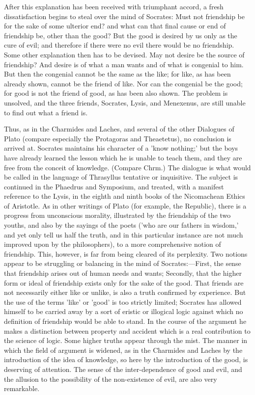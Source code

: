 \documentclass[11pt,letter]{article}
\begin{document}
\par  After this explanation has been received with triumphant accord, a fresh dissatisfaction begins to steal over the mind of Socrates: Must not friendship be for the sake of some ulterior end? and what can that final cause or end of friendship be, other than the good? But the good is desired by us only as the cure of evil; and therefore if there were no evil there would be no friendship. Some other explanation then has to be devised. May not desire be the source of friendship? And desire is of what a man wants and of what is congenial to him. But then the congenial cannot be the same as the like; for like, as has been already shown, cannot be the friend of like. Nor can the congenial be the good; for good is not the friend of good, as has been also shown. The problem is unsolved, and the three friends, Socrates, Lysis, and Menexenus, are still unable to find out what a friend is.

\par  Thus, as in the Charmides and Laches, and several of the other Dialogues of Plato (compare especially the Protagoras and Theaetetus), no conclusion is arrived at. Socrates maintains his character of a 'know nothing;' but the boys have already learned the lesson which he is unable to teach them, and they are free from the conceit of knowledge. (Compare Chrm.) The dialogue is what would be called in the language of Thrasyllus tentative or inquisitive. The subject is continued in the Phaedrus and Symposium, and treated, with a manifest reference to the Lysis, in the eighth and ninth books of the Nicomachean Ethics of Aristotle. As in other writings of Plato (for example, the Republic), there is a progress from unconscious morality, illustrated by the friendship of the two youths, and also by the sayings of the poets ('who are our fathers in wisdom,' and yet only tell us half the truth, and in this particular instance are not much improved upon by the philosophers), to a more comprehensive notion of friendship. This, however, is far from being cleared of its perplexity. Two notions appear to be struggling or balancing in the mind of Socrates:—First, the sense that friendship arises out of human needs and wants; Secondly, that the higher form or ideal of friendship exists only for the sake of the good. That friends are not necessarily either like or unlike, is also a truth confirmed by experience. But the use of the terms 'like' or 'good' is too strictly limited; Socrates has allowed himself to be carried away by a sort of eristic or illogical logic against which no definition of friendship would be able to stand. In the course of the argument he makes a distinction between property and accident which is a real contribution to the science of logic. Some higher truths appear through the mist. The manner in which the field of argument is widened, as in the Charmides and Laches by the introduction of the idea of knowledge, so here by the introduction of the good, is deserving of attention. The sense of the inter-dependence of good and evil, and the allusion to the possibility of the non-existence of evil, are also very remarkable.
\end{document}
